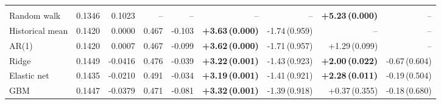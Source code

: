 \begin{tabular}{lrrrrrrrr}
\addlinespace
\multicolumn{9}{l}{\emph{SOL, $h=7$}} \\
\quad Random walk & 0.1346 & 0.1023 & -- & -- & -- & -- & \textbf{+5.23\,(0.000)} & -- \\
\quad Historical mean & 0.1420 & 0.0000 & 0.467 & -0.103 & \textbf{+3.63\,(0.000)} & -1.74\,(0.959) & -- & -- \\
\quad AR(1) & 0.1420 & 0.0007 & 0.467 & -0.099 & \textbf{+3.62\,(0.000)} & -1.71\,(0.957) & +1.29\,(0.099) & -- \\
\quad Ridge & 0.1449 & -0.0416 & 0.476 & -0.039 & \textbf{+3.22\,(0.001)} & -1.43\,(0.923) & \textbf{+2.00\,(0.022)} & -0.67\,(0.604) \\
\quad Elastic net & 0.1435 & -0.0210 & 0.491 & -0.034 & \textbf{+3.19\,(0.001)} & -1.41\,(0.921) & \textbf{+2.28\,(0.011)} & -0.19\,(0.504) \\
\quad GBM & 0.1447 & -0.0379 & 0.471 & -0.081 & \textbf{+3.32\,(0.001)} & -1.39\,(0.918) & +0.37\,(0.355) & -0.18\,(0.680) \\
\bottomrule
\end{tabular}
